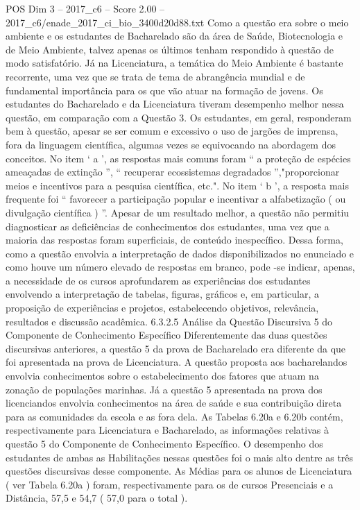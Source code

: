 \begin{textsample}{POS Dim 3 – 2017\_c6 – Score 2.00 – 2017\_c6/enade\_2017\_ci\_bio\_3400d20d88.txt}
Como a questão era sobre o meio ambiente e os estudantes de Bacharelado são da área de Saúde, Biotecnologia e de Meio Ambiente, talvez apenas os últimos tenham respondido à questão de modo satisfatório.
Já na Licenciatura, a temática do Meio Ambiente é bastante recorrente, uma vez que se trata de tema de abrangência mundial e de fundamental importância para os que vão atuar na formação de jovens.
Os estudantes do Bacharelado e da Licenciatura tiveram desempenho melhor nessa questão, em comparação com a Questão 3.
Os estudantes, em geral, responderam bem à questão, apesar se ser comum e excessivo o uso de jargões de imprensa, fora da linguagem científica, algumas vezes se equivocando na abordagem dos conceitos.
No item ‘ a ’, as respostas mais comuns foram “ a proteção de espécies ameaçadas de extinção ”, “ recuperar ecossistemas degradados ”,"proporcionar meios e incentivos para a pesquisa científica, etc.".
No item ‘ b ’, a resposta mais frequente foi “ favorecer a participação popular e incentivar a alfabetização ( ou divulgação científica ) ”.
Apesar de um resultado melhor, a questão não permitiu diagnosticar as deficiências de conhecimentos dos estudantes, uma vez que a maioria das respostas foram superficiais, de conteúdo inespecífico.
Dessa forma, como a questão envolvia a interpretação de dados disponibilizados no enunciado e como houve um número elevado de respostas em branco, pode -se indicar, apenas, a necessidade de os cursos aprofundarem as experiências dos estudantes envolvendo a interpretação de tabelas, figuras, gráficos e, em particular, a proposição de experiências e projetos, estabelecendo objetivos, relevância, resultados e discussão acadêmica. 6.3.2.5 Análise da Questão Discursiva 5 do Componente de Conhecimento Específico Diferentemente das duas questões discursivas anteriores, a questão 5 da prova de Bacharelado era diferente da que foi apresentada na prova de Licenciatura.
A questão proposta aos bacharelandos envolvia conhecimentos sobre o estabelecimento dos fatores que atuam na zonação de populações marinhas.
Já a questão 5 apresentada na prova dos licenciandos envolvia conhecimentos na área de saúde e sua contribuição direta para as comunidades da escola e as fora dela.
As Tabelas 6.20a e 6.20b contém, respectivamente para Licenciatura e Bacharelado, as informações relativas à questão 5 do Componente de Conhecimento Específico.
O desempenho dos estudantes de ambas as Habilitações nessas questões foi o mais alto dentre as três questões discursivas desse componente.
As Médias para os alunos de Licenciatura ( ver Tabela 6.20a ) foram, respectivamente para os de cursos Presenciais e a Distância, 57,5 e 54,7 ( 57,0 para o total ).

\end{textsample}
